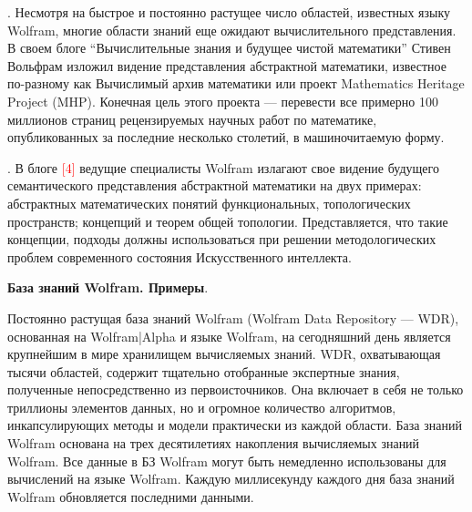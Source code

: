 . Несмотря на быстрое и постоянно растущее число областей, известных языку Wolfram, многие области знаний еще ожидают вычислительного представления. В своем блоге ``Вычислительные знания и будущее чистой математики'' Стивен Вольфрам изложил видение представления абстрактной математики, известное по-разному как Вычислимый архив математики или проект Mathematics Heritage Project (MHP). Конечная цель этого проекта --- перевести все примерно 100 миллионов страниц рецензируемых научных работ по математике, опубликованных за последние несколько столетий, в машиночитаемую форму.

. 
В блоге \textcolor{red}{[4]} ведущие специалисты Wolfram излагают свое видение будущего семантического представления абстрактной математики на двух примерах: абстрактных математических понятий функциональных, топологических пространств; концепций и теорем общей топологии. 
Представляется, что такие концепции, подходы должны использоваться при решении методологических проблем современного состояния Искусственного интеллекта. 

\textbf{База знаний Wolfram. Примеры}.

Постоянно растущая база знаний Wolfram (Wolfram
Data Repository --- WDR), основанная на Wolfram|Alpha и языке Wolfram, на сегодняшний день является крупнейшим в мире хранилищем вычисляемых знаний. 
WDR, охватывающая тысячи областей, содержит тщательно отобранные экспертные знания, полученные непосредственно из первоисточников. 
Она включает в себя не только триллионы элементов данных, но и огромное количество алгоритмов, инкапсулирующих методы и модели практически из каждой области.
База знаний Wolfram основана на трех десятилетиях накопления вычисляемых знаний Wolfram. Все данные в БЗ Wolfram могут быть немедленно использованы для вычислений на языке Wolfram. Каждую миллисекунду каждого дня база знаний Wolfram обновляется последними данными. 

